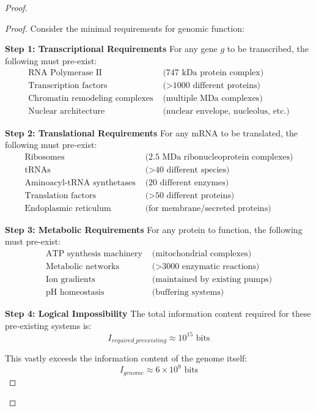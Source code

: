 \documentclass[12pt,a4paper]{article}
\begin{document}
\begin{proof}
\begin{proof}
Consider the minimal requirements for genomic function:

\textbf{Step 1: Transcriptional Requirements}
For any gene $g$ to be transcribed, the following must pre-exist:
\begin{align}
\text{RNA Polymerase II} &\text{ (747 kDa protein complex)} \\
\text{Transcription factors} &\text{ (>1000 different proteins)} \\
\text{Chromatin remodeling complexes} &\text{ (multiple MDa complexes)} \\
\text{Nuclear architecture} &\text{ (nuclear envelope, nucleolus, etc.)}
\end{align}

\textbf{Step 2: Translational Requirements}
For any mRNA to be translated, the following must pre-exist:
\begin{align}
\text{Ribosomes} &\text{ (2.5 MDa ribonucleoprotein complexes)} \\
\text{tRNAs} &\text{ (>40 different species)} \\
\text{Aminoacyl-tRNA synthetases} &\text{ (20 different enzymes)} \\
\text{Translation factors} &\text{ (>50 different proteins)} \\
\text{Endoplasmic reticulum} &\text{ (for membrane/secreted proteins)}
\end{align}

\textbf{Step 3: Metabolic Requirements}
For any protein to function, the following must pre-exist:
\begin{align}
\text{ATP synthesis machinery} &\text{ (mitochondrial complexes)} \\
\text{Metabolic networks} &\text{ (>3000 enzymatic reactions)} \\
\text{Ion gradients} &\text{ (maintained by existing pumps)} \\
\text{pH homeostasis} &\text{ (buffering systems)}
\end{align}

\textbf{Step 4: Logical Impossibility}
The total information content required for these pre-existing systems is:
\begin{equation}
I_{required\_preexisting} \approx 10^{15} \text{ bits}
\end{equation}

This vastly exceeds the information content of the genome itself:
\begin{equation}
I_{genome} \approx 6 \times 10^9 \text{ bits}
\end{equation}


\end{proof}
\end{proof}
\end{document}

